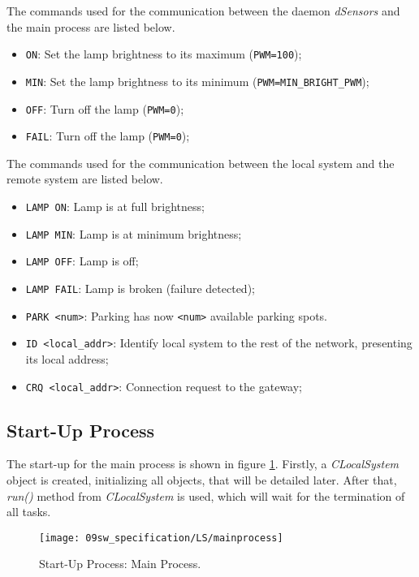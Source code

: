 
The commands used for the communication between the daemon \textit{dSensors} and the main process are listed below.

\begin{itemize}
	\item \verb|ON|: Set the lamp brightness to its maximum (\verb|PWM=100|);
	\item \verb|MIN|: Set the lamp brightness to its minimum (\verb|PWM=MIN_BRIGHT_PWM|);
	\item \verb|OFF|: Turn off the lamp (\verb|PWM=0|);
	\item \verb|FAIL|: Turn off the lamp (\verb|PWM=0|);
\end{itemize}

The commands used for the communication between the local system and the remote system are listed below.
\begin{itemize}
	\item \verb|LAMP ON|: Lamp is at full brightness;
	\item \verb|LAMP MIN|: Lamp is at minimum brightness;
	\item \verb|LAMP OFF|: Lamp is off;
	\item \verb|LAMP FAIL|: Lamp is broken (failure detected);
	\item \verb|PARK <num>|: Parking has now \verb|<num>| available parking spots.
	
	\item \verb|ID <local_addr>|: Identify local system to the rest of the network, presenting its local address;
	
	\item \verb|CRQ <local_addr>|: Connection request to the gateway;	
\end{itemize}


\clearpage
\subsection{Start-Up Process}


The start-up for the main process is shown in figure \ref{fig:mainprocess}. Firstly, a \textit{CLocalSystem} object is created, initializing all objects, that will be detailed later. After that, \textit{run()} method from \textit{CLocalSystem} is used, which will wait for the termination of all tasks.

\begin{figure}[H]
	\centering
	\texttt{[image: 09sw\_specification/LS/mainprocess]}
	\caption{Start-Up Process: Main Process.}
	\label{fig:mainprocess}
\end{figure}

